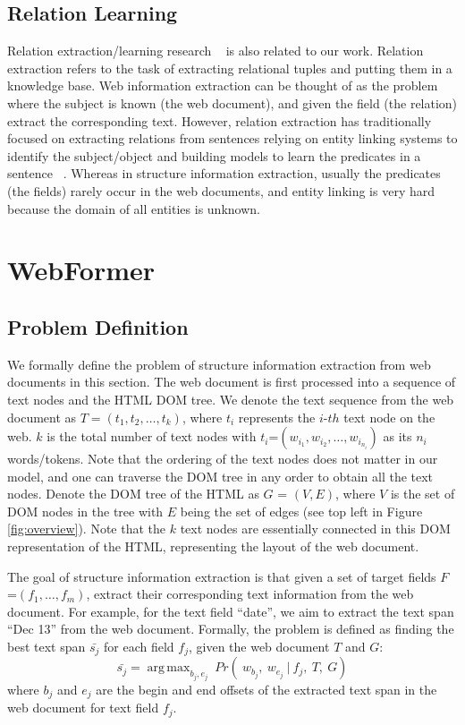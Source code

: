 \documentclass[sigconf]{acmart}
\DeclareMathOperator*{\argmax}{arg\,max}
\begin{document}
\subsection{Relation Learning}
Relation extraction/learning research ~\cite{ZhengLWYZ16,HeCLZZZ18,LiLSZYHJ20,LiuCWZLX20,LockardSDH20,XuCZ21} is also related to our work.
Relation extraction refers to the task of extracting relational tuples and putting them in a knowledge base. Web information extraction can be thought of as the problem where the subject is known (the web document), and given the field (the relation) extract the corresponding text.
However, relation extraction has traditionally focused on extracting relations from sentences relying on entity linking systems to identify the subject/object and building models to learn the predicates in a sentence ~\cite{LevySCZ17,0005FC0S19}. Whereas in structure information extraction, usually the predicates (the fields) rarely occur in the web documents, and entity linking is very hard because the domain of all entities is unknown.

\section{WebFormer}
\subsection{Problem Definition}
We formally define the problem of structure information extraction from web documents in this section. The web document is first processed into a sequence of text nodes and the HTML DOM tree.
We denote the text sequence from the web document as $T = (t_1, t_2, \dots, t_k)$, where $t_i$ represents the $i$-$th$ text node on the web. $k$ is the total number of text nodes with $t_i$=$(w_{i_1},w_{i_2},\dots,w_{i_{n_i}})$ as its $n_i$ words/tokens. Note that the ordering of the text nodes does not matter in our model, and one can traverse the DOM tree in any order to obtain all the text nodes.
Denote the DOM tree of the HTML as $G$ = $(V, E)$, where $V$ is the set of DOM nodes in the tree with $E$ being the set of edges (see top left in Figure \ref{fig:overview}). Note that the $k$ text nodes are essentially connected in this DOM representation of the HTML, representing the layout of the web document.

The goal of structure information extraction is that given a set of target fields $F$=$(f_1,\dots,f_m)$, extract their corresponding text information from the web document. For example, for the text field ``date'', we aim to extract the text span ``Dec 13'' from the web document. Formally, the problem is defined as finding the best text span $\bar{s_j}$ for each field $f_j$, given the web document $T$ and $G$:
\[\bar{s_j} = \argmax_{b_j,e_j} \ Pr( \ w_{b_j}, \ w_{e_j} \ | \ f_j, \ T, \ G)\]
where $b_j$ and $e_j$ are the begin and end offsets of the extracted text span in the web document for text field $f_j$.
\end{document}
